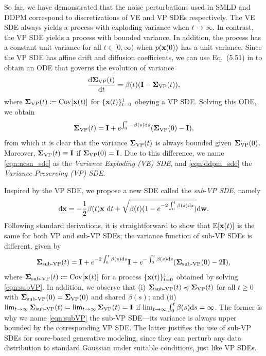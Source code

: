 So far, we have demonstrated that the noise perturbations used in SMLD and DDPM correspond to discretizations of VE and VP SDEs respectively. The VE SDE always yields a process with exploding variance when $t \to \infty$. In contrast, the VP SDE yields a process with bounded variance. In addition, the process has a constant unit variance for all $t \in [0, \infty)$ when $p(\mathbf{x}(0))$ has a unit variance. Since the VP SDE has affine drift and diffusion coefficients, we can use Eq.~(5.51) in \citet{sarkka2019applied} to obtain an ODE that governs the evolution of variance
\begin{align*}
    \frac{\mathrm{d} \mathbf{\Sigma}_\text{VP}(t)}{\mathrm{d} t} = \beta(t) (\mathbf{I} - \mathbf{\Sigma}_\text{VP}(t)),
\end{align*}
where $\mathbf{\Sigma}_\text{VP}(t) \coloneqq \operatorname{Cov}[\mathbf{x}(t)]$ for $\{\mathbf{x}(t)\}_{t=0}^1$ obeying a VP SDE. Solving this ODE, we obtain
\begin{align}
    \mathbf{\Sigma}_\text{VP}(t) = \mathbf{I} + e^{\int_0^t - \beta(s) \mathrm{d} s}(\mathbf{\Sigma}_\text{VP}(0) - \mathbf{I}),
\end{align}
from which it is clear that the variance $\mathbf{\Sigma}_\text{VP}(t)$ is always bounded given $\mathbf{\Sigma}_\text{VP}(0)$. Moreover, $\mathbf{\Sigma}_\text{VP}(t) \equiv \mathbf{I}$ if $\mathbf{\Sigma}_\text{VP}(0) = \mathbf{I}$. Due to this difference, we name \cref{eqn:ncsn_sde} as the \emph{Variance Exploding (VE) SDE}, and \cref{eqn:ddpm_sde} the \emph{Variance Preserving (VP) SDE}.

Inspired by the VP SDE, we propose a new SDE called the \emph{sub-VP SDE}, namely
\begin{align}
    \mathrm{d} \mathbf{x} = -\frac{1}{2}\beta(t) \mathbf{x}~ \mathrm{d} t + \sqrt{\beta(t)(1 - e^{-2\int_0^t \beta(s)\mathrm{d} s})} \mathrm{d} \mathbf{w}.\label{eqn:subVP}
\end{align}
Following standard derivations, it is straightforward to show that $\mathbb{E}[\mathbf{x}(t)]$ is the same for both VP and sub-VP SDEs; the variance function of sub-VP SDEs is different, given by
\begin{align}
    \mathbf{\Sigma}_\text{sub-VP}(t) = \mathbf{I} + e^{-2 \int_{0}^t \beta(s)\mathrm{d} s} \mathbf{I} + e^{-\int_0^t \beta(s) \mathrm{d} s}(\mathbf{\Sigma}_\text{sub-VP}(0) - 2\mathbf{I}),
\end{align}
where $\mathbf{\Sigma}_\text{sub-VP}(t) \coloneqq \operatorname{Cov}[\mathbf{x}(t)]$ for a process $\{\mathbf{x}(t)\}_{t=0}^1$ obtained by solving \cref{eqn:subVP}. In addition, we observe that (i) $\mathbf{\Sigma}_{\text{sub-VP}}(t) \preccurlyeq \mathbf{\Sigma}_{\text{VP}}(t)$ for all $t \geq 0$ with $\mathbf{\Sigma}_\text{sub-VP}(0) = \mathbf{\Sigma}_\text{VP}(0)$ and shared $\beta(s)$; and (ii) $\lim_{t\to \infty} \mathbf{\Sigma}_{\text{sub-VP}}(t) = \lim_{t \to \infty}\mathbf{\Sigma}_{\text{VP}}(t) = \mathbf{I}$ if $\lim_{t\to \infty}\int_0^t \beta(s) \mathrm{d} s = \infty$. The former is why we name \cref{eqn:subVP} the sub-VP SDE---its variance is always upper bounded by the corresponding VP SDE. The latter justifies the use of sub-VP SDEs for score-based generative modeling, since they can perturb any data distribution to standard Gaussian under suitable conditions, just like VP SDEs.


